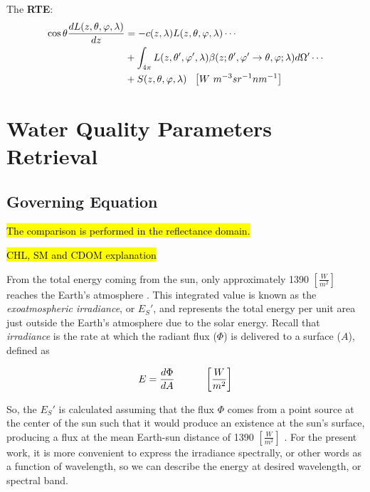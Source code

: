The \textbf{RTE}:
\begin{align}
	\cos\theta\frac{dL(z,\theta,\varphi,\lambda)}{dz}&=-c(z,\lambda)L(z,\theta,\varphi,\lambda)\cdots \notag \\
	&+\int_{4\pi} L(z,\theta',\varphi',\lambda)\beta(z;\theta',\varphi' \to \theta,\varphi;\lambda)d\Omega'\cdots \notag  \\
	&+S(z,\theta,\varphi,\lambda)~~\left[W~m^{-3}sr^{-1}nm^{-1} \right]
\end{align}
\section{Water Quality Parameters Retrieval}
\cite{Jensen}
\cite{Mustard2001}
\subsection{Governing Equation}

\hl{The comparison is performed in the reflectance domain.}

\hl{CHL, SM and CDOM explanation}

From the total energy coming from the sun, only approximately 1390 $\left[\frac{W}{m^2}\right]$ reaches the Earth's atmosphere \cite{Schott}. This integrated value is known as the \emph{exoatmospheric irradiance}, or $E_S'$, and represents the total energy per unit area just outside the Earth's atmosphere due to the solar energy. Recall that \emph{irradiance} is the rate at which the radiant flux ($\Phi$) is delivered to a surface ($A$), defined as

\begin{equation} \label{eq:irradiance}
E = \frac{d\Phi}{dA}   \indent   \indent  \left[\frac{W}{m^2}\right]  
\end{equation} 

So, the $E_S'$ is calculated assuming that the flux $\Phi$ comes from a point source at the center of the sun such that it would produce an existence at the sun's surface, producing a flux at the mean Earth-sun distance of 1390 $\left[\frac{W}{m^2}\right]$ . For the present work, it is more convenient to express the irradiance spectrally, or other words as a function of wavelength, so we can describe the energy at desired wavelength, or spectral band.

